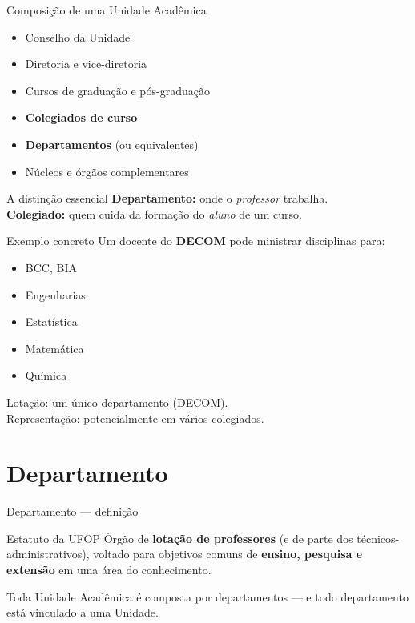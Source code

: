\documentclass[aspectratio=169]{beamer}
\newcommand{\impt}[1]{\textcolor{maccent}{\textbf{#1}}}
\newcommand{\ntc}[1]{\textcolor{mprimary}{#1}}
\begin{document}
\begin{frame}{Composição de uma Unidade Acadêmica}
  \begin{itemize}
    \item Conselho da Unidade
    \item Diretoria e vice-diretoria
    \item Cursos de graduação e pós-graduação
    \item \impt{Colegiados de curso}
    \item \impt{Departamentos} (ou equivalentes)
    \item Núcleos e órgãos complementares
  \end{itemize}

  \vspace{0.4cm}
   
  \begin{alertblock}{A distinção essencial}
    \textbf{Departamento:} onde o \emph{professor} trabalha.\\
    \textbf{Colegiado:} quem cuida da formação do \emph{aluno} de um curso.
  \end{alertblock}
\end{frame}

\begin{frame}{Exemplo concreto}
  Um docente do \impt{DECOM} pode ministrar disciplinas para:
  \begin{itemize}
    \item BCC, BIA
    \item Engenharias
    \item Estatística
    \item Matemática
    \item Química
  \end{itemize}

  \vspace{0.3cm}
   
  \ntc{Lotação:} um único departamento (DECOM).\\
  \ntc{Representação:} potencialmente em vários colegiados.
\end{frame}

\section{Departamento}

\begin{frame}{Departamento --- definição}
  \begin{block}{Estatuto da UFOP}
    Órgão de \impt{lotação de professores} (e de parte dos técnicos-administrativos), voltado para objetivos comuns de \impt{ensino, pesquisa e extensão} em uma área do conhecimento.
  \end{block}

  \vspace{0.4cm}

  Toda Unidade Acadêmica é composta por departamentos --- e todo departamento está vinculado a uma Unidade.
\end{frame}
\end{document}
